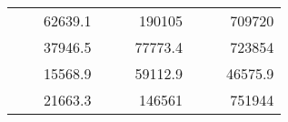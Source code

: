 \begin{table}[H]
\begin{tabular}{|ccrccrccc}
\rowcolor[HTML]{DDFDFF} 
\multicolumn{1}{|c|}{\cellcolor[HTML]{FFFFC7}}                                & \multicolumn{1}{c|}{\cellcolor[HTML]{DDFDFF}}                      & \multicolumn{1}{r|}{\cellcolor[HTML]{DAE8FC}62639.1}   & \multicolumn{1}{c|}{\cellcolor[HTML]{FFFFC7}}                                & \multicolumn{1}{c|}{\cellcolor[HTML]{DDFDFF}}                       & \multicolumn{1}{r|}{\cellcolor[HTML]{DDFDFF}190105}    & \multicolumn{1}{c|}{\cellcolor[HTML]{FFFFC7}}                                & \multicolumn{1}{c|}{\cellcolor[HTML]{DDFDFF}}                      & \multicolumn{1}{r|}{\cellcolor[HTML]{DDFDFF}709720}    \\ \cline{3-3} \cline{6-6} \cline{9-9} 
\multicolumn{1}{|c|}{\cellcolor[HTML]{FFFFC7}}                                & \multicolumn{1}{c|}{\cellcolor[HTML]{DDFDFF}}                      & \multicolumn{1}{r|}{\cellcolor[HTML]{DDFDFF}37946.5}   & \multicolumn{1}{c|}{\cellcolor[HTML]{FFFFC7}}                                & \multicolumn{1}{c|}{\cellcolor[HTML]{DDFDFF}}                       & \multicolumn{1}{r|}{\cellcolor[HTML]{DAE8FC}77773.4}   & \multicolumn{1}{c|}{\cellcolor[HTML]{FFFFC7}}                                & \multicolumn{1}{c|}{\cellcolor[HTML]{DDFDFF}}                      & \multicolumn{1}{r|}{\cellcolor[HTML]{DAE8FC}723854}    \\ \cline{3-3} \cline{6-6} \cline{9-9} 
\rowcolor[HTML]{DDFDFF} 
\multicolumn{1}{|c|}{\cellcolor[HTML]{FFFFC7}}                                & \multicolumn{1}{c|}{\cellcolor[HTML]{DDFDFF}}                      & \multicolumn{1}{r|}{\cellcolor[HTML]{DAE8FC}15568.9}   & \multicolumn{1}{c|}{\cellcolor[HTML]{FFFFC7}}                                & \multicolumn{1}{c|}{\cellcolor[HTML]{DDFDFF}}                       & \multicolumn{1}{r|}{\cellcolor[HTML]{DDFDFF}59112.9}   & \multicolumn{1}{c|}{\cellcolor[HTML]{FFFFC7}}                                & \multicolumn{1}{c|}{\cellcolor[HTML]{DDFDFF}}                      & \multicolumn{1}{r|}{\cellcolor[HTML]{DDFDFF}46575.9}   \\ \cline{3-3} \cline{6-6} \cline{9-9} 
\multicolumn{1}{|c|}{\cellcolor[HTML]{FFFFC7}}                                & \multicolumn{1}{c|}{\cellcolor[HTML]{DDFDFF}}                      & \multicolumn{1}{r|}{\cellcolor[HTML]{DDFDFF}21663.3}   & \multicolumn{1}{c|}{\cellcolor[HTML]{FFFFC7}}                                & \multicolumn{1}{c|}{\cellcolor[HTML]{DDFDFF}}                       & \multicolumn{1}{r|}{\cellcolor[HTML]{DAE8FC}146561}    & \multicolumn{1}{c|}{\cellcolor[HTML]{FFFFC7}}                                & \multicolumn{1}{c|}{\cellcolor[HTML]{DDFDFF}}                      & \multicolumn{1}{r|}{\cellcolor[HTML]{DAE8FC}751944}    \\ \cline{3-3} \cline{6-6} \cline{9-9} 

\end{tabular}
\end{table}

